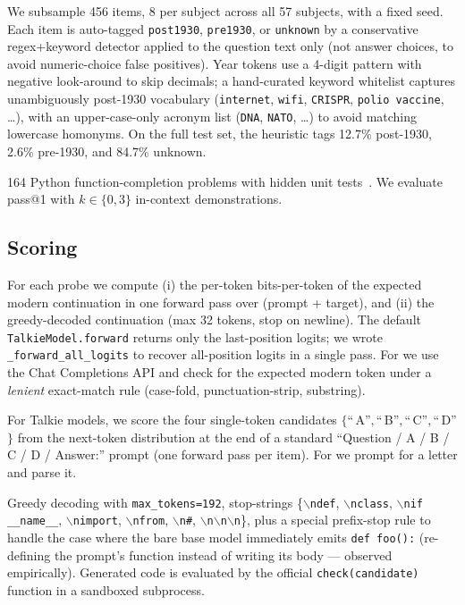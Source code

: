  We subsample 456 \mmlu items, 8 per subject across all 57 subjects, with a fixed seed. Each item is auto-tagged \texttt{post1930}, \texttt{pre1930}, or \texttt{unknown} by a conservative regex+keyword detector applied to the question text only (not answer choices, to avoid numeric-choice false positives). Year tokens use a 4-digit pattern with negative look-around to skip decimals; a hand-curated keyword whitelist captures unambiguously post-1930 vocabulary (\texttt{internet}, \texttt{wifi}, \texttt{CRISPR}, \texttt{polio vaccine}, \dots), with an upper-case-only acronym list (\texttt{DNA}, \texttt{NATO}, \dots) to avoid matching lowercase homonyms. On the full \mmlu test set, the heuristic tags 12.7\% post-1930, 2.6\% pre-1930, and 84.7\% unknown.

 164 Python function-completion problems with hidden unit tests~\citep{chen2021humaneval}. We evaluate pass@1 with $k \in \{0, 3\}$ in-context demonstrations.

\subsection{Scoring}
\label{sec:method:scoring}

 For each probe we compute (i) the per-token bits-per-token of the expected modern continuation in one forward pass over (prompt + target), and (ii) the greedy-decoded continuation (max 32 tokens, stop on newline). The default \texttt{TalkieModel.forward} returns only the last-position logits; we wrote \texttt{\_forward\_all\_logits} to recover all-position logits in a single pass. For \gptfour we use the Chat Completions API and check for the expected modern token under a \emph{lenient} exact-match rule (case-fold, punctuation-strip, substring).

 For Talkie models, we score the four single-token candidates $\{$``\,A''$, $``\,B''$, $``\,C''$, $``\,D''$\}$ from the next-token distribution at the end of a standard ``Question / A / B / C / D / Answer:'' prompt (one forward pass per item). For \gptfour we prompt for a letter and parse it.

 Greedy decoding with \texttt{max\_tokens=192}, stop-strings \{\texttt{$\backslash$ndef}, \texttt{$\backslash$nclass}, \texttt{$\backslash$nif \_\_name\_\_}, \texttt{$\backslash$nimport}, \texttt{$\backslash$nfrom}, \texttt{$\backslash$n\#}, \texttt{$\backslash$n$\backslash$n$\backslash$n}\}, plus a special prefix-stop rule to handle the case where the bare base model immediately emits \texttt{def foo():} (re-defining the prompt's function instead of writing its body --- observed empirically). Generated code is evaluated by the official \texttt{check(candidate)} function in a sandboxed subprocess.

